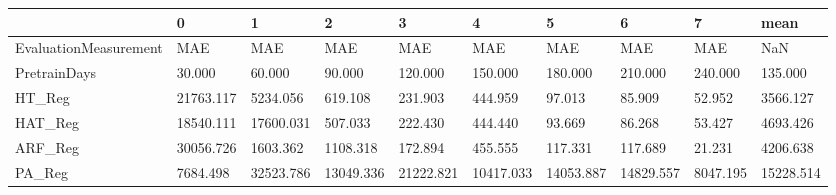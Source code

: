 \begin{tabular}{llllllllll}
\toprule
{} &         0 &         1 &         2 &         3 &         4 &         5 &         6 &        7 &      mean \\
\midrule
EvaluationMeasurement &       MAE &       MAE &       MAE &       MAE &       MAE &       MAE &       MAE &      MAE &       NaN \\
PretrainDays          &    30.000 &    60.000 &    90.000 &   120.000 &   150.000 &   180.000 &   210.000 &  240.000 &   135.000 \\
HT\_Reg                & 21763.117 &  5234.056 &   619.108 &   231.903 &   444.959 &    97.013 &    85.909 &   52.952 &  3566.127 \\
HAT\_Reg               & 18540.111 & 17600.031 &   507.033 &   222.430 &   444.440 &    93.669 &    86.268 &   53.427 &  4693.426 \\
ARF\_Reg               & 30056.726 &  1603.362 &  1108.318 &   172.894 &   455.555 &   117.331 &   117.689 &   21.231 &  4206.638 \\
PA\_Reg                &  7684.498 & 32523.786 & 13049.336 & 21222.821 & 10417.033 & 14053.887 & 14829.557 & 8047.195 & 15228.514 \\
\bottomrule
\end{tabular}
